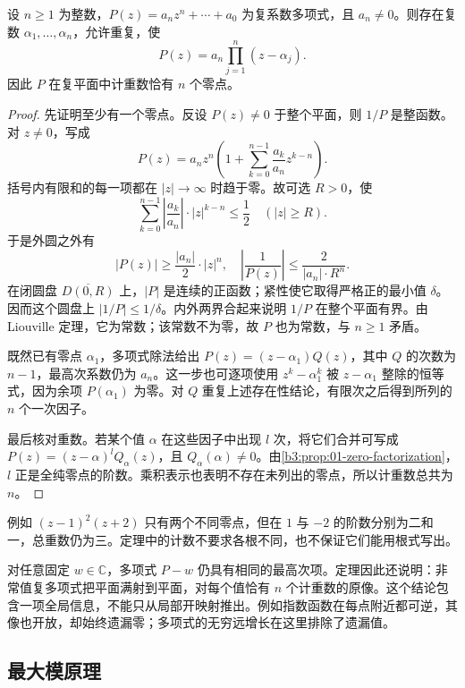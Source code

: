 \begin{theorem}[代数基本定理]\label{b3:thm:02-fundamental-algebra}
设 \(n\ge1\) 为整数，\(P(z)=a_nz^n+\cdots+a_0\) 为复系数多项式，且 \(a_n\ne0\)。则存在复数 \(\alpha_1,\ldots,\alpha_n\)，允许重复，使
\[
 P(z)=a_n\prod_{j=1}^n(z-\alpha_j).
\]
因此 \(P\) 在复平面中计重数恰有 \(n\) 个零点。
\end{theorem}
\begin{proof}
先证明至少有一个零点。反设 \(P(z)\ne0\) 于整个平面，则 \(1/P\) 是整函数。对 \(z\ne0\)，写成
\[
 P(z)=a_nz^n\left(1+\sum_{k=0}^{n-1}\frac{a_k}{a_n}z^{k-n}\right).
\]
括号内有限和的每一项都在 \(|z|\to\infty\) 时趋于零。故可选 \(R>0\)，使
\[
 \sum_{k=0}^{n-1}\left|\frac{a_k}{a_n}\right|\cdot|z|^{k-n}
 \le\frac12\quad(|z|\ge R).
\]
于是外圆之外有
\[
 |P(z)|\ge\frac{|a_n|}{2}\cdot|z|^n,
 \quad\left|\frac1{P(z)}\right|
 \le\frac{2}{|a_n|\cdot R^n}.
\]
在闭圆盘 \(\overline{D(0,R)}\) 上，\(|P|\) 是连续的正函数；紧性使它取得严格正的最小值 \(\delta\)。因而这个圆盘上 \(|1/P|\le1/\delta\)。内外两界合起来说明 \(1/P\) 在整个平面有界。由 Liouville 定理，它为常数；该常数不为零，故 \(P\) 也为常数，与 \(n\ge1\) 矛盾。

既然已有零点 \(\alpha_1\)，多项式除法给出
\(P(z)=(z-\alpha_1)Q(z)\)，其中 \(Q\) 的次数为 \(n-1\)，最高次系数仍为 \(a_n\)。这一步也可逐项使用 \(z^k-\alpha_1^k\) 被 \(z-\alpha_1\) 整除的恒等式，因为余项 \(P(\alpha_1)\) 为零。对 \(Q\) 重复上述存在性结论，有限次之后得到所列的 \(n\) 个一次因子。

最后核对重数。若某个值 \(\alpha\) 在这些因子中出现 \(l\) 次，将它们合并可写成 \(P(z)=(z-\alpha)^lQ_\alpha(z)\)，且 \(Q_\alpha(\alpha)\ne0\)。由\cref{b3:prop:01-zero-factorization}，\(l\) 正是全纯零点的阶数。乘积表示也表明不存在未列出的零点，所以计重数总共为 \(n\)。
\end{proof}

例如 \((z-1)^2(z+2)\) 只有两个不同零点，但在 \(1\) 与 \(-2\) 的阶数分别为二和一，总重数仍为三。定理中的计数不要求各根不同，也不保证它们能用根式写出。

\ProseParagraphBreak

对任意固定 \(w\in\mathbb C\)，多项式 \(P-w\) 仍具有相同的最高次项。定理因此还说明：非常值复多项式把平面满射到平面，对每个值恰有 \(n\) 个计重数的原像。这个结论包含一项全局信息，不能只从局部开映射推出。例如指数函数在每点附近都可逆，其像也开放，却始终遗漏零；多项式的无穷远增长在这里排除了遗漏值。

\subsection{最大模原理}
\label{b3:subsec:020403}

